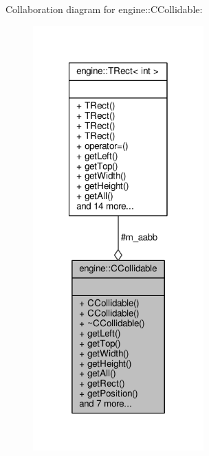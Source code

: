 Collaboration diagram for engine\-:\-:C\-Collidable\-:
\nopagebreak
\begin{figure}[H]
\begin{center}
\leavevmode
\includegraphics[width=186pt]{classengine_1_1CCollidable__coll__graph}
\end{center}
\end{figure}
